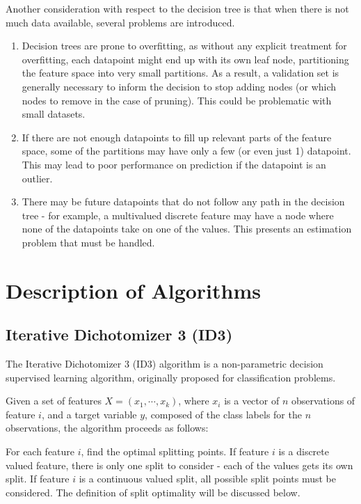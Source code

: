 \documentclass{amsart}
\begin{document}
    Another consideration with respect to the decision tree is that when there is not much data available,
    several problems are introduced.
    \begin{enumerate}
        \item Decision trees are prone to overfitting, as without any explicit treatment for overfitting, each
        datapoint might end up with its own leaf node, partitioning the feature space into very small partitions. As
        a result, a validation set is generally necessary to inform the decision to stop adding nodes (or which nodes to
        remove in the case of pruning). This could be problematic with small datasets.
        \item If there are not enough datapoints to fill up relevant parts of the feature space, some of the
        partitions may have only a few (or even just  1) datapoint. This may lead to poor performance on prediction
        if the datapoint is an outlier.
        \item There may be future datapoints that do not follow any path in the decision tree - for example,
        a multivalued discrete feature may have a node where none of the datapoints take on one of the values.
        This presents an estimation problem that must be handled.
    \end{enumerate}

    \section{Description of Algorithms}
    \subsection{Iterative Dichotomizer 3 (ID3)}
    The Iterative Dichotomizer 3 (ID3)\cite{id3} algorithm
    is a non-parametric decision supervised learning algorithm, originally proposed for
    classification problems.

    Given a set of features $X = (x_1, \cdots, x_k)$, where $x_i$ is a vector
    of $n$ observations of feature $i$, and a target variable $y$, composed of the
    class labels for the $n$ observations, the algorithm proceeds as follows:

    For each feature $i$, find the optimal splitting points. If feature $i$ is a
    discrete valued feature, there is only one split to consider - each of the values gets its own
    split. If feature $i$ is a continuous valued split, all possible split points must be considered.
    The definition of split optimality will be discussed below.
\end{document}
